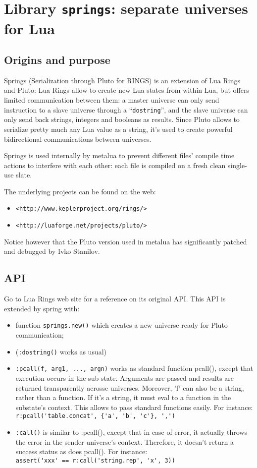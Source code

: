\section{Library {\tt springs}: separate universes for Lua} 

\subsection{Origins and purpose}
Springs (Serialization through Pluto for RINGS) is an extension of Lua Rings and
Pluto: Lua Rings allow to create new Lua states from within Lua, but offers
limited communication between them: a master universe can only send instruction
to a slave universe through a ``{\tt dostring}'', and the slave universe can
only send back strings, integers and booleans as results. Since Pluto allows to
serialize pretty much any Lua value as a string, it's used to create powerful
bidirectional communications between universes.

Springs is used internally by metalua to prevent different files' compile time
actions to interfere with each other: each file is compiled on a fresh clean
single-use slate.

The underlying projects can be found on the web:
\begin{itemize}
\item \verb|<http://www.keplerproject.org/rings/>|
\item \verb|<http://luaforge.net/projects/pluto/>|
\end{itemize}
Notice however that the Pluto version used in metalua has significantly patched
and debugged by Ivko Stanilov.

\subsection{API}
Go to Lua Rings web site for a reference on its original API. This API is
extended by spring with:
\begin{itemize}
\item function {\tt springs.new()} which creates a new universe ready for Pluto
  communication;
\item ({\tt:dostring()} works as usual)
\item {\tt :pcall(f, arg1, ..., argn)} works as standard function pcall(),
  except that execution occurs in the sub-state. Arguments are passed and
  results are returned transparently acrosse universes. Moreover, 'f' can also
  be a string, rather than a function. If it's a string, it must eval to a
  function in the substate's context. This allows to pass standard functions
  easily. For instance:\\
  \verb|r:pcall('table.concat', {'a', 'b', 'c'}, ',')|
\item {\tt :call()} is similar to :pcall(), except that in case of error, it
  actually throws the error in the sender universe's context. Therefore, it
  doesn't return a success status as does pcall(). For instance: \\
  \verb|assert('xxx' == r:call('string.rep', 'x', 3))|
\end{itemize}
